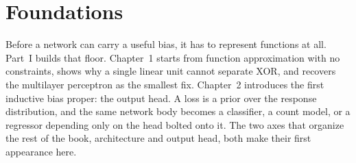 \part{Foundations}

Before a network can carry a useful bias, it has to represent functions
at all. Part~I builds that floor. Chapter~1 starts from function
approximation with no constraints, shows why a single linear unit
cannot separate XOR, and recovers the multilayer perceptron as the
smallest fix. Chapter~2 introduces the first inductive bias proper: the
output head. A loss is a prior over the response distribution, and the
same network body becomes a classifier, a count model, or a regressor
depending only on the head bolted onto it. The two axes that organize
the rest of the book, architecture and output head, both make their
first appearance here.



